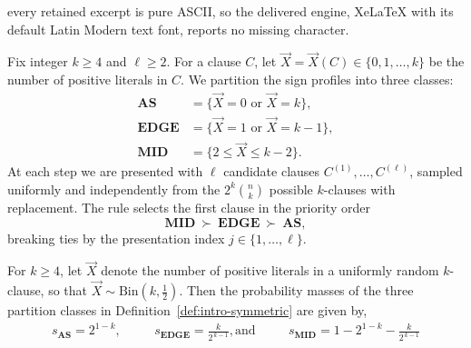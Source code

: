 \documentclass[10pt,a4paper]{amsart}
\newcommand\Def{Definition}
\newcommand\vX{\vec X}
\begin{document}
every retained excerpt is pure ASCII, so the delivered engine, XeLaTeX with its default Latin Modern text font, reports no missing character.
	\begin{definition}\label{def:intro-symmetric}
		Fix integer $k\ge 4$ and $\ell\ge 2$.
		For a clause $C$, let $\vX=\vX(C)\in\{0,1,\ldots,k\}$ be the number of positive literals in $C$.
		We partition the sign profiles into three classes:
		\begin{align*}
			\textbf{AS}&=\{\vX=0 \text{ or } \vX=k\},\\
			\textbf{EDGE}&=\{\vX=1 \text{ or } \vX=k-1\},\\
			\textbf{MID}&=\{2\le \vX\le k-2\}.
		\end{align*}
		At each step we are presented with $\ell$ candidate clauses $C^{(1)},\ldots,C^{(\ell)}$, sampled uniformly and independently from the $2^k\binom{n}{k}$ possible $k$-clauses with replacement.
		The rule selects the first clause in the priority order
		\[
		\textbf{MID}~\succ~\textbf{EDGE}~\succ~\textbf{AS},
		\]
		breaking ties by the presentation index $j\in\{1,\ldots,\ell\}$.
	\end{definition}

	\begin{lemma}\label{lem_binom}
		For $k\geq 4$, let $\vX$ denote the number of positive literals in a uniformly random $k$-clause, so that $\vX\sim\text{Bin}(k,\tfrac{1}{2})$.
		Then the probability masses of the three partition classes in \Def~\ref{def:intro-symmetric} are given by,
		\begin{align*}
			s_{\mathrm{\textbf{AS}}}=
			2^{1-k}, && \quad 
			s_{\mathrm{\textbf{EDGE}}}=
			\frac{k}{2^{\,k-1}},
			\mbox{and} && \quad 
			s_{\mathrm{\textbf{MID}}}=
			1-2^{1-k}-\frac{k}{2^{\,k-1}}
		\end{align*}
	\end{lemma}
\end{document}
